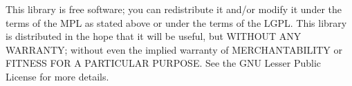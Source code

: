 This library is free software; you can redistribute it and/or modify it under the terms of the M\-P\-L as stated above or under the terms of the L\-G\-P\-L. This library is distributed in the hope that it will be useful, but W\-I\-T\-H\-O\-U\-T A\-N\-Y W\-A\-R\-R\-A\-N\-T\-Y; without even the implied warranty of M\-E\-R\-C\-H\-A\-N\-T\-A\-B\-I\-L\-I\-T\-Y or F\-I\-T\-N\-E\-S\-S F\-O\-R A P\-A\-R\-T\-I\-C\-U\-L\-A\-R P\-U\-R\-P\-O\-S\-E. See the G\-N\-U Lesser Public License for more details. 
